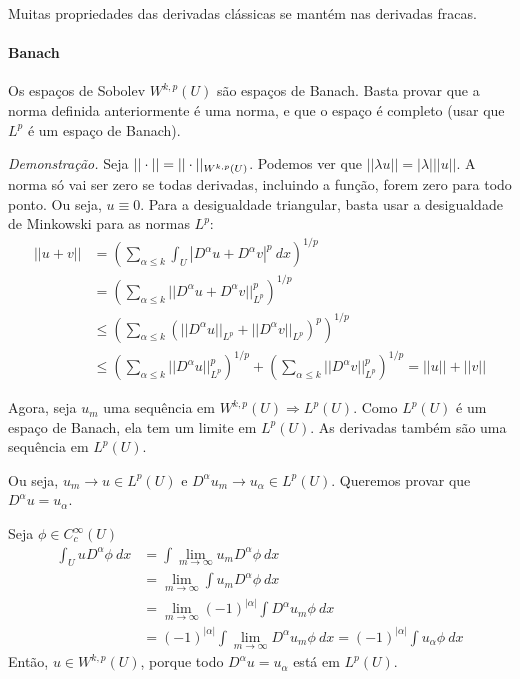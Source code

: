 \documentclass[a4paper, 11pt]{book}
\begin{document}
Muitas propriedades das derivadas clássicas se mantém nas derivadas fracas.

\paragraph{Banach} Os espaços de Sobolev \( W^{k,p}(U) \) são espaços de Banach. Basta provar que a norma definida anteriormente é uma norma, e que o espaço é completo (usar que \( L^p \) é um espaço de Banach).

\textit{Demonstração.} Seja \( || \cdot ||= ||\cdot ||_{W^{k,p}(U)} \). Podemos ver que \( ||\lambda u|| = |\lambda| ||u|| \). A norma só vai ser zero se todas derivadas, incluindo a função, forem zero para todo ponto. Ou seja, \( u \equiv 0 \). Para a desigualdade triangular, basta usar a desigualdade de Minkowski para as normas \( L^p \): \begin{align*}
	||u+v|| &= \left( \sum_{\alpha \leq k}\int_U | D^\alpha u + D^\alpha v |^p\ dx \right)^{1/p} \\
	&= \left( \sum_{\alpha \leq k} ||D^\alpha u+D^\alpha v||_{L^p}^p \right)^{1/p}\\
	&\leq  \left( \sum_{\alpha \leq k} (||D^\alpha u||_{L^p}+||D^\alpha v||_{L^p})^p \right)^{1/p}\\
	&\leq  \left( \sum_{\alpha \leq k} ||D^\alpha u||_{L^p}^p \right)^{1/p}+\left( \sum_{\alpha\leq k} ||D^\alpha v||_{L^p}^p \right)^{1/p} = ||u|| + ||v||
\end{align*}

Agora, seja \( u_m \) uma sequência em \( W^{k,p}(U)\Rightarrow L^p(U) \). Como \( L^p(U) \) é um espaço de Banach, ela tem um limite em \( L^p(U) \). As derivadas também são uma sequência em \( L^p(U) \).

Ou seja, \( u_m \rightarrow u \in L^p(U) \) e \( D^\alpha u_m \rightarrow u_{\alpha} \in L^p(U) \). Queremos provar que \(D^\alpha u = u_\alpha \).

Seja \( \phi \in C^\infty_c(U) \)
\begin{align*}
	\int_U u D^\alpha \phi\ dx &= \int \lim_{m \rightarrow \infty} u_m D^\alpha \phi \ dx	\\
	&= \lim_{m \rightarrow \infty} \int  u_m D^\alpha \phi \ dx	\\
	&= \lim_{m \rightarrow \infty} (-1)^{|\alpha| }\int D^\alpha  u_m \phi \ dx\\
	&= (-1)^{|\alpha| }\int  \lim_{m \rightarrow \infty} D^\alpha  u_m \phi \ dx = (-1)^{|\alpha| }\int  u_\alpha \phi \ dx
\end{align*}
Então, \( u \in W^{k,p}(U) \), porque todo \( D^\alpha u = u_\alpha \) está em \( L^p(U) \).
\end{document}
